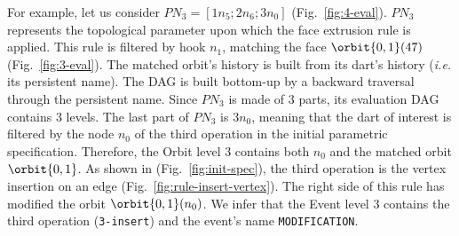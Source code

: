For example, let us consider $PN_{3}=[1n_5;2n_6;3n_0]$ (Fig.~\ref{fig:4-eval}). 
$PN_3$ represents the topological parameter upon which the face extrusion rule is applied. This rule is filtered by hook $n_1$, matching the face $\orbit{0, 1}(47)$ (Fig.~\ref{fig:3-eval}).
The matched orbit's history is built from its dart's history (\textit{i.e.} its persistent name). %
The DAG is built bottom-up by a backward traversal through the persistent name. %
Since $PN_3$ is made of 3 parts, its evaluation DAG contains 3 levels.
The last part of $PN_3$ is $3n_0$, meaning that the dart of interest is filtered by the node $n_0$ of the 
third operation in the initial parametric specification.
Therefore, the Orbit level 3 contains both $n_0$ and the matched orbit $\orbit{0, 1}$.
As shown in (Fig.~\ref{fig:init-spec}), the third operation is the vertex in\-ser\-tion on an edge (Fig.~\ref{fig:rule-insert-vertex}). The right side of this rule has modified the orbit $\orbit{0,1}(n_0)$. We infer that the Event level 3 contains the third operation (\verb+3-insert+) and the event's name \texttt{MODIFICATION}.

